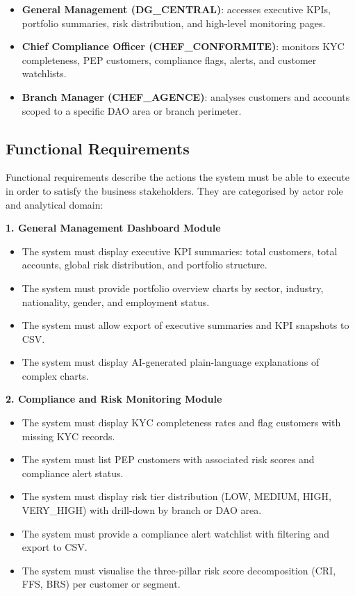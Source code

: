 \begin{itemize}
    \item \textbf{General Management (DG\_CENTRAL)}: accesses executive KPIs, portfolio
    summaries, risk distribution, and high-level monitoring pages.
    \item \textbf{Chief Compliance Officer (CHEF\_CONFORMITE)}: monitors KYC completeness,
    PEP customers, compliance flags, alerts, and customer watchlists.
    \item \textbf{Branch Manager (CHEF\_AGENCE)}: analyses customers and accounts scoped to
    a specific DAO area or branch perimeter.
\end{itemize}

\subsection{Functional Requirements}

Functional requirements describe the actions the system must be able to execute in order to
satisfy the business stakeholders. They are categorised by actor role and analytical domain:

\textbf{1. General Management Dashboard Module}
\begin{itemize}
    \item The system must display executive KPI summaries: total customers, total accounts,
    global risk distribution, and portfolio structure.
    \item The system must provide portfolio overview charts by sector, industry, nationality,
    gender, and employment status.
    \item The system must allow export of executive summaries and KPI snapshots to CSV.
    \item The system must display AI-generated plain-language explanations of complex charts.
\end{itemize}

\textbf{2. Compliance and Risk Monitoring Module}
\begin{itemize}
    \item The system must display KYC completeness rates and flag customers with missing
    KYC records.
    \item The system must list PEP customers with associated risk scores and compliance
    alert status.
    \item The system must display risk tier distribution (LOW, MEDIUM, HIGH, VERY\_HIGH)
    with drill-down by branch or DAO area.
    \item The system must provide a compliance alert watchlist with filtering and export
    to CSV.
    \item The system must visualise the three-pillar risk score decomposition (CRI, FFS,
    BRS) per customer or segment.
\end{itemize}


